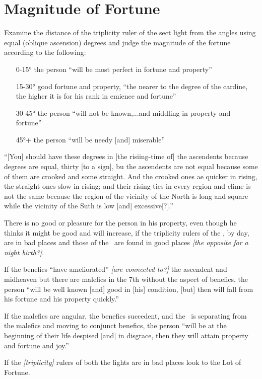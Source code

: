 \section{Magnitude of Fortune}

Examine the distance of the triplicity ruler of the sect light from the angles using equal (oblique ascension) degrees and judge the magnitude of the fortune according to the following:
\begin{itemize}[topsep=0em,itemsep=0em]
\item[0-15°] the person ``will be most perfect in fortune and property''
\item[15-30°] good fortune and property, ``the nearer to the degree of the cardine, the higher it is for his rank in emience and fortune''
\item[30-45°] the person ``will not be known,...and middling in property and fortune''
\item[45°+]  the person ``will be needy [and] miserable''
\end{itemize}

``[You] should have these degrees in [the risiing-time of] the ascendents because degrees are equal, thirty [to a sign], bu the ascendents are not equal because some of them are crooked and some straight. And the crooked ones ae quicker in rising, the straight ones slow in rising; and their rising-ties in every region and clime is not the same because the region of the vicinity of the North is long and square while the vicinity of the Suth is low [and] excessive[?].''

There is no good or pleasure for the person in his property, even though he thinks it might be good and will increase, if the triplicity rulers of the \Sun, by day, are in bad places and those of the \Moon\, are found in good places \textsl{[the opposite for a night birth?]}.

If the benefics ``have ameliorated'' \textsl{[are connected to?]} the ascendent and midheaven but there are malefics in the 7th without the aspect of benefics, the person ``will be well known [and] good in [his] condition, [but] then will fall from his fortune and his property quickly.''

If the malefics are angular, the benefics succedent, and the \Moon\, is separating from the malefics and moving to conjunct  benefics, the person ``will be at the beginning of their life despised [and] in disgrace, then they will attain property and fortune and joy.''

If the \textsl{[triplicity]} rulers of both the lights are in bad places look to the Lot of Fortune.

